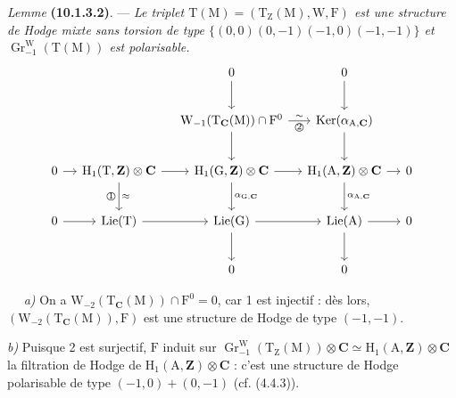 \documentclass[11pt,leqno]{article}
\newcommand{\Page}[1]{\ifvmode\noindent\else\unskip\ \fi{\footnotesize\textcolor{gray}{[p.\,#1]}}\ \ignorespaces}
\begin{document}
\textit{Lemme} \textbf{(10.1.3.2)}. —
\textit{Le triplet
\(\mathrm{T}(\mathrm{M})=(\mathrm{T}_{\mathrm{Z}}(\mathrm{M}),
\mathrm{W},\mathrm{F})\) est une structure de Hodge mixte sans torsion
de type \(\{(0,0)(0,-1)(-1,0)(-1,-1)\}\) et
\(\operatorname{Gr}^{\mathrm{W}}_{-1}(\mathrm{T}(\mathrm{M}))\)
est polarisable.}
\[
\begin{tikzcd}[column sep=1.1em, row sep=2.3em]
& & 0 \arrow[d] & 0 \arrow[d] &
\\
& &
\mathrm{W}_{-1}(\mathrm{T}_{\mathbf{C}}(\mathrm{M}))\cap\mathrm{F}^0
  \arrow[r, "\sim", "{\text{\textcircled{2}}}"']
  \arrow[d]
&
\operatorname{Ker}(\alpha_{\mathrm{A},\mathbf{C}})
  \arrow[d]
&
\\
0 \arrow[r]
&
\mathrm{H}_1(\mathrm{T},\mathbf{Z})\otimes\mathbf{C}
  \arrow[r]
  \arrow[d, "\approx", "{\text{\textcircled{1}}}"']
&
\mathrm{H}_1(\mathrm{G},\mathbf{Z})\otimes\mathbf{C}
  \arrow[r]
  \arrow[d, "{\alpha_{\mathrm{G},\mathbf{C}}}"]
&
\mathrm{H}_1(\mathrm{A},\mathbf{Z})\otimes\mathbf{C}
  \arrow[r]
  \arrow[d, "{\alpha_{\mathrm{A},\mathbf{C}}}"]
&
0
\\
0 \arrow[r]
&
\operatorname{Lie}(\mathrm{T}) \arrow[r]
&
\operatorname{Lie}(\mathrm{G}) \arrow[r] \arrow[d]
&
\operatorname{Lie}(\mathrm{A}) \arrow[r] \arrow[d]
&
0
\\
& & 0 & 0 &
\end{tikzcd}
\]

\Page{55}
\textit{a)} On a
\(\mathrm{W}_{-2}(\mathrm{T}_{\mathbf{C}}(\mathrm{M}))
\cap\mathrm{F}^0=0\), car 1 est injectif : dès lors,
\((\mathrm{W}_{-2}(\mathrm{T}_{\mathbf{C}}(\mathrm{M})),\mathrm{F})\)
est une structure de Hodge de type \((-1,-1)\).

\textit{b)} Puisque 2 est surjectif, \(\mathrm{F}\) induit sur
\(\operatorname{Gr}^{\mathrm{W}}_{-1}
(\mathrm{T}_{\mathrm{Z}}(\mathrm{M}))\otimes\mathbf{C}
\simeq\mathrm{H}_1(\mathrm{A},\mathbf{Z})\otimes\mathbf{C}\)
la filtration de Hodge de
\(\mathrm{H}_1(\mathrm{A},\mathbf{Z})\otimes\mathbf{C}\) :
c’est une structure de Hodge polarisable de type
\((-1,0)+(0,-1)\) (cf. (4.4.3)).
\end{document}
